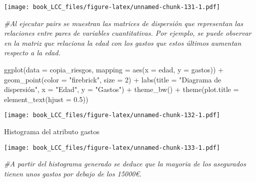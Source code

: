 \documentclass[
]{book}
\newenvironment{Shaded}{\begin{snugshade}}{\end{snugshade}}
\newcommand{\AttributeTok}[1]{\textcolor[rgb]{0.77,0.63,0.00}{#1}}
\newcommand{\CommentTok}[1]{\textcolor[rgb]{0.56,0.35,0.01}{\textit{#1}}}
\newcommand{\DecValTok}[1]{\textcolor[rgb]{0.00,0.00,0.81}{#1}}
\newcommand{\FloatTok}[1]{\textcolor[rgb]{0.00,0.00,0.81}{#1}}
\newcommand{\FunctionTok}[1]{\textcolor[rgb]{0.00,0.00,0.00}{#1}}
\newcommand{\NormalTok}[1]{#1}
\newcommand{\SpecialCharTok}[1]{\textcolor[rgb]{0.00,0.00,0.00}{#1}}
\newcommand{\StringTok}[1]{\textcolor[rgb]{0.31,0.60,0.02}{#1}}
\begin{document}
\texttt{[image: book\_LCC\_files/figure-latex/unnamed-chunk-131-1.pdf]}

\begin{Shaded}
\begin{Highlighting}[]
\CommentTok{\#Al ejecutar pairs se muestran las matrices de dispersión que representan las relaciones entre pares de variables cuantitativas. Por ejemplo, se puede observar en la matriz que relaciona la edad con los gastos que estos últimos aumentan respecto a la edad.}
\end{Highlighting}
\end{Shaded}

\begin{Shaded}
\begin{Highlighting}[]
\FunctionTok{ggplot}\NormalTok{(}\AttributeTok{data =}\NormalTok{ copia\_riesgos, }\AttributeTok{mapping =} \FunctionTok{aes}\NormalTok{(}\AttributeTok{x =}\NormalTok{ edad, }\AttributeTok{y =}\NormalTok{ gastos)) }\SpecialCharTok{+}
\FunctionTok{geom\_point}\NormalTok{(}\AttributeTok{color =} \StringTok{"firebrick"}\NormalTok{, }\AttributeTok{size =} \DecValTok{2}\NormalTok{) }\SpecialCharTok{+}
\FunctionTok{labs}\NormalTok{(}\AttributeTok{title =} \StringTok{"Diagrama de dispersión"}\NormalTok{, }\AttributeTok{x =} \StringTok{"Edad"}\NormalTok{, }\AttributeTok{y =} \StringTok{"Gastos"}\NormalTok{) }\SpecialCharTok{+}
\FunctionTok{theme\_bw}\NormalTok{() }\SpecialCharTok{+}
\FunctionTok{theme}\NormalTok{(}\AttributeTok{plot.title =} \FunctionTok{element\_text}\NormalTok{(}\AttributeTok{hjust =} \FloatTok{0.5}\NormalTok{))}
\end{Highlighting}
\end{Shaded}

\texttt{[image: book\_LCC\_files/figure-latex/unnamed-chunk-132-1.pdf]}

Histograma del atributo gastos

\begin{Shaded}
\end{Shaded}

\texttt{[image: book\_LCC\_files/figure-latex/unnamed-chunk-133-1.pdf]}

\begin{Shaded}
\begin{Highlighting}[]
\CommentTok{\#A partir del histograma generado se deduce que la mayoria de los asegurados tienen unos gastos por debajo de los 15000€. }
\end{Highlighting}
\end{Shaded}
\end{document}
